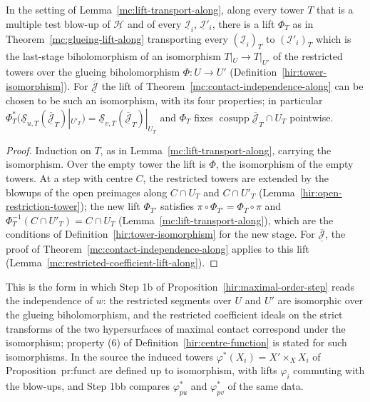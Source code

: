 \begin{theorem}
\label{mc:glueing-lift-tower-isomorphism}
\leanok
In the setting of Lemma~\ref{mc:lift-transport-along}, along every tower \(T\) that is a multiple test blow-up of \(\underline{\mathcal H}\) and of every \(\underline{\mathcal I}_i\),
\(\underline{\mathcal I}'_i\), there is a lift \(\Phi_T\) as in Theorem~\ref{mc:glueing-lift-along} transporting every \((\underline{\mathcal I}_i)_T\) to \((\underline{\mathcal I}'_i)_T\) which
is the last-stage biholomorphism of an isomorphism \(T|_U\to T|_{U'}\) of the restricted towers over the glueing biholomorphism \(\Phi\colon U\to U'\)
(Definition~\ref{hir:tower-isomorphism}). For \(\overline{\underline{\mathcal J}}\) the lift of Theorem~\ref{mc:contact-independence-along} can be chosen to be such an isomorphism,
with its four properties; in particular \(\Phi_T^*(\underline{\mathcal S}_{u,T}(\overline{\underline{\mathcal J}}_T)|_{U'_T})=\underline{\mathcal S}_{v,T}(\overline{\underline{\mathcal J}}_T)|_{U_T}\)
and \(\Phi_T\) fixes \(\operatorname{cosupp}\overline{\underline{\mathcal J}}_T\cap U_T\) pointwise.
\end{theorem}
\begin{proof}
\leanok
Induction on \(T\), as in Lemma~\ref{mc:lift-transport-along}, carrying the isomorphism. Over the empty tower the lift is \(\Phi\), the isomorphism of the empty towers.
At a step with centre \(C\), the restricted towers are extended by the blowups of the open preimages along \(C\cap U_T\) and \(C\cap U'_T\)
(Lemma~\ref{hir:open-restriction-tower}); the new lift \(\Phi_{T'}\) satisfies \(\pi\circ\Phi_{T'}=\Phi_T\circ\pi\) and \(\Phi_T^{-1}(C\cap U'_T)=C\cap U_T\) (Lemma~\ref{mc:lift-transport-along}), which are the conditions of Definition~\ref{hir:tower-isomorphism} for the new stage. For
\(\overline{\underline{\mathcal J}}\), the proof of Theorem~\ref{mc:contact-independence-along} applies to this lift (Lemma~\ref{mc:restricted-coefficient-lift-along}).
\end{proof}
This is the form in which Step 1b of Proposition~\ref{hir:maximal-order-step} reads the independence of \(w\): the restricted segments over \(U\) and \(U'\) are isomorphic over the
glueing biholomorphism, and the restricted coefficient ideals on the strict transforms of the two hypersurfaces of maximal contact correspond under the isomorphism;
property (6) of Definition~\ref{hir:centre-function} is stated for such isomorphisms. In the source the induced towers \(\varphi^*(X_i)=X'\times_XX_i\) of Proposition~pr:funct
are defined up to isomorphism, with lifts \(\varphi_i\) commuting with the blow-ups, and Step 1bb compares \(\varphi_{pu}^*\) and \(\varphi_{pv}^*\) of the same data.


